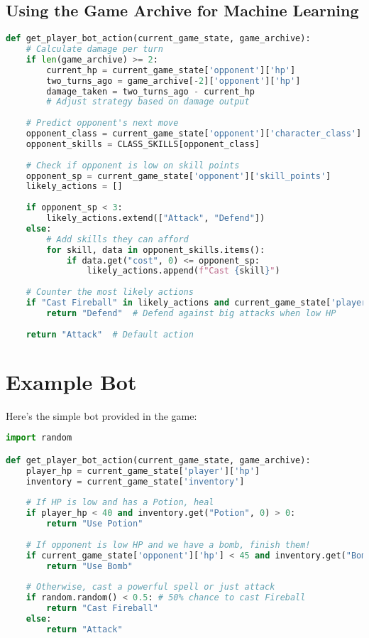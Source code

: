 \documentclass[12pt]{article}
\begin{document}
\subsection{Using the Game Archive for Machine Learning}
\begin{lstlisting}[language=Python, caption=Advanced Archive Analysis]
def get_player_bot_action(current_game_state, game_archive):
    # Calculate damage per turn
    if len(game_archive) >= 2:
        current_hp = current_game_state['opponent']['hp']
        two_turns_ago = game_archive[-2]['opponent']['hp']
        damage_taken = two_turns_ago - current_hp
        # Adjust strategy based on damage output
    
    # Predict opponent's next move
    opponent_class = current_game_state['opponent']['character_class']
    opponent_skills = CLASS_SKILLS[opponent_class]
    
    # Check if opponent is low on skill points
    opponent_sp = current_game_state['opponent']['skill_points']
    likely_actions = []
    
    if opponent_sp < 3:
        likely_actions.extend(["Attack", "Defend"])
    else:
        # Add skills they can afford
        for skill, data in opponent_skills.items():
            if data.get("cost", 0) <= opponent_sp:
                likely_actions.append(f"Cast {skill}")
    
    # Counter the most likely actions
    if "Cast Fireball" in likely_actions and current_game_state['player']['hp'] < 50:
        return "Defend"  # Defend against big attacks when low HP
    
    return "Attack"  # Default action
\end{lstlisting}

\section{Example Bot}
\label{sec:example}

Here's the simple bot provided in the game:

\begin{lstlisting}[language=Python, caption=Example Bot Implementation]
import random

def get_player_bot_action(current_game_state, game_archive):
    player_hp = current_game_state['player']['hp']
    inventory = current_game_state['inventory']
    
    # If HP is low and has a Potion, heal
    if player_hp < 40 and inventory.get("Potion", 0) > 0:
        return "Use Potion"
    
    # If opponent is low HP and we have a bomb, finish them!
    if current_game_state['opponent']['hp'] < 45 and inventory.get("Bomb", 0) > 0:
        return "Use Bomb"
        
    # Otherwise, cast a powerful spell or just attack
    if random.random() < 0.5: # 50% chance to cast Fireball
        return "Cast Fireball"
    else:
        return "Attack"
\end{lstlisting}
\end{document}
